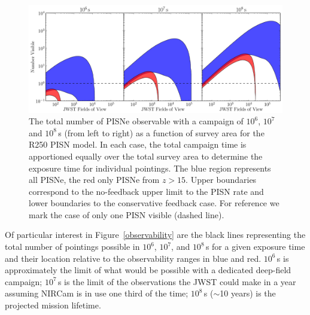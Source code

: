 \documentclass{thesis}
\newcommand{\about}{\ensuremath{\sim}}
\newcommand{\RefFig}[1]{\mbox{Figure~\ref{#1}}}
\begin{document}
\begin{figure}
\begin{center}
  \includegraphics[width=\columnwidth]{area_observability_R250}
  \caption{The total number of PISNe observable with a
    campaign of $10^6$, $10^7$ and $10^8\,$s (from left to right) as a
    function of survey area for the R250 PISN model.  In each case,
    the total campaign time is apportioned equally over the total
    survey area to determine the exposure time for individual
    pointings.  The blue region represents all PISNe, the red only
    PISNe from $z>15$.  Upper boundaries correspond to the no-feedback
    upper limit to the PISN rate and lower boundaries to the
    conservative feedback case. For reference we mark the case of only
    one PISN visible (dashed line).}
 \label{area_obsR250}
\end{center}
\end{figure}  
Of particular interest in \RefFig{observability} are the black lines
representing the total number of pointings possible in $10^6$, $10^7$,
and $10^8\,$s for a given exposure time and their location relative to
the observability ranges in blue and red.  $10^6\,$s is approximately
the limit of what would be possible with a dedicated deep-field
campaign; $10^7\,$s is the limit of the observations the JWST could
make in a year assuming NIRCam is in use one third of the time;
$10^8\,$s (\about10 years) is the projected mission lifetime. 
\end{document}
